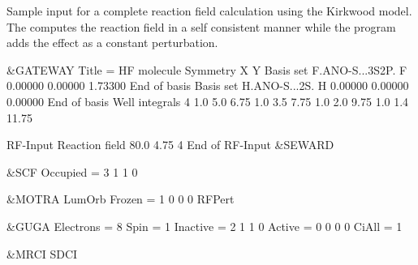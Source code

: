 Sample input for a complete reaction field calculation using the Kirkwood model.
The  computes the reaction field in a
self consistent manner while the 
program adds the effect as a constant perturbation.

\begin{inputlisting}
 &GATEWAY
Title =  HF molecule
Symmetry
X Y
Basis set
F.ANO-S...3S2P.
F      0.00000   0.00000   1.73300
End of basis
Basis set
H.ANO-S...2S.
H      0.00000   0.00000   0.00000
End of basis
Well integrals
 4
 1.0 5.0  6.75
 1.0 3.5  7.75
 1.0 2.0  9.75
 1.0 1.4 11.75

RF-Input
Reaction field
 80.0 4.75 4
End of RF-Input
 &SEWARD

 &SCF
Occupied =  3 1 1 0

 &MOTRA
LumOrb
Frozen   =  1 0 0 0
RFPert

 &GUGA
Electrons =     8
Spin      =     1
Inactive  =     2    1    1    0
Active    =     0    0    0    0
CiAll     =     1

 &MRCI
SDCI
\end{inputlisting}

